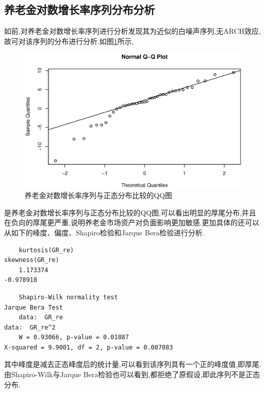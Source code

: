 \subsection{养老金对数增长率序列分布分析}
如前,对养老金对数增长率序列进行分析发现其为近似的白噪声序列,无ARCH效应,故可对该序列的分布进行分析.如图\ref{fig:qqre}所示,
\begin{figure}[h!]
\centering
\includegraphics[width=0.5\linewidth]{pic/re/qqre}
\caption{养老金对数增长率序列与正态分布比较的QQ图}
\label{fig:qqre}
\end{figure}
是养老金对数增长率序列与正态分布比较的QQ图,可以看出明显的厚尾分布,并且在负向的厚尾更严重,说明养老金市场资产对负面影响更加敏感.更加具体的还可以从如下的峰度、偏度、Shapiro检验和Jarque Bera检验进行分析.
\begin{framed}
	\begin{verbatim}
	kurtosis(GR_re)                                                   skewness(GR_re)
	1.173374                                                              -0.978918
	\end{verbatim}
\end{framed}
\begin{framed}
	\begin{verbatim}
	Shapiro-Wilk normality test                                           Jarque Bera Test
	data:  GR_re                                                                  data:  GR_re^2
	W = 0.93066, p-value = 0.01887                                   X-squared = 9.9001, df = 2, p-value = 0.007083
	\end{verbatim}
\end{framed}
其中峰度是减去正态峰度后的统计量,可以看到该序列具有一个正的峰度值,即厚尾.由Shapiro-Wilk与Jarque Bera检验也可以看到,都拒绝了原假设,即此序列不是正态分布.

